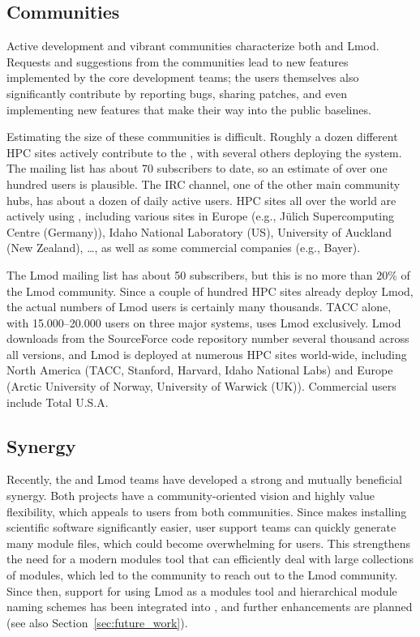 \subsection{Communities}
\label{sec:communities}

Active development and vibrant communities characterize both \easybuild{} and Lmod. Requests and suggestions from the communities lead to new features implemented by the core
development teams; the
users themselves also significantly contribute by reporting bugs, sharing patches, and even implementing new features
that make their way into the public baselines.

Estimating the size of these communities is difficult.
Roughly a dozen different HPC sites actively contribute to the \easybuild{}, with
several others deploying the system. The \easybuild{} mailing list has about 70 subscribers
to date, so an estimate of over one hundred
users is plausible. The \easybuild{} IRC channel, one of the other main community hubs, has
about a dozen of daily active users. HPC sites all over the world are
actively using \easybuild{}, including various sites in Europe (e.g., J\"ulich
Supercomputing Centre (Germany)), Idaho National Laboratory (US), University of
Auckland (New Zealand), \ldots, as well as some commercial companies (e.g., Bayer).

The Lmod mailing list has about 50 subscribers, but this
is no more than $20\%$ of the Lmod community. Since a
couple of hundred HPC sites already deploy Lmod, the actual
numbers of Lmod users is certainly many thousands. TACC alone, with 15.000--20.000 users
on three major systems, uses Lmod exclusively. Lmod downloads
from the SourceForce code repository number several thousand across all versions, and Lmod is deployed at numerous HPC sites world-wide, including North America (TACC,
Stanford, Harvard, Idaho National Labs) and Europe (Arctic
University of Norway, University of Warwick (UK)). Commercial users include Total U.S.A.

\subsection{Synergy}

Recently, the \easybuild{} and Lmod teams have developed 
a strong and mutually beneficial synergy. Both projects have a
community-oriented vision and highly value flexibility, which appeals to users
from both communities. Since \easybuild{} makes installing scientific software
significantly easier, user support teams can quickly generate many module
files, which could become overwhelming for users. This strengthens the need for a
modern modules tool that can efficiently deal with large collections of modules,
which led to the \easybuild{} community to reach out to the Lmod community.
Since then, support for using Lmod as a modules tool and  hierarchical
module naming schemes has been integrated into \easybuild{}, and further
enhancements are planned (see also Section~\ref{sec:future_work}).

